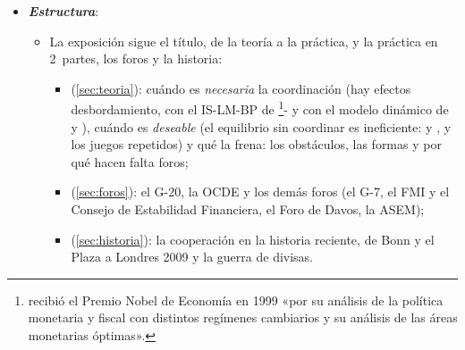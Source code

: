 \documentclass[11pt]{article}
\begin{document}
\begin{itemize}
\item \textbf{\emph{Estructura}}:
  \begin{itemize}
  \item La exposición sigue el título, de la teoría a la práctica, y la práctica en 2~partes, los foros y la historia:
    \begin{itemize}
    \item {} (\ref{sec:teoria}): cuándo es \emph{necesaria} la coordinación (hay efectos desbordamiento, con el IS-LM-BP de \footnote{ recibió el Premio Nobel de Economía en 1999 «por su análisis de la política monetaria y fiscal con distintos regímenes cambiarios y su análisis de las áreas monetarias óptimas»\nocite{Nobel1999Mundell}.}- y con el modelo dinámico de  y ), cuándo es \emph{deseable} (el equilibrio sin coordinar es ineficiente:  y , y los juegos repetidos) y qué la frena: los obstáculos, las formas y por qué hacen falta foros;
    \item {} (\ref{sec:foros}): el G-20, la OCDE y los demás foros (el G-7, el FMI y el Consejo de Estabilidad Financiera, el Foro de Davos, la ASEM);
    \item {} (\ref{sec:historia}): la cooperación en la historia reciente, de Bonn y el Plaza a Londres 2009 y la guerra de divisas.
    \end{itemize}
  \end{itemize}
\end{itemize}
\end{document}
